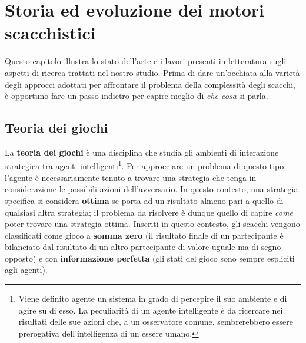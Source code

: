 \chapter{Storia ed evoluzione dei motori scacchistici} %
%
\begin{citazione}
    Questo capitolo illustra lo stato dell'arte e i lavori presenti in letteratura sugli aspetti di ricerca trattati nel nostro studio. 
    Prima di dare un'occhiata alla varietà degli approcci adottati per affrontare il problema della complessità degli scacchi, 
    è opportuno fare un passo indietro per capire meglio di \textit{che cosa} si parla.
\end{citazione}

\section{Teoria dei giochi}
La \textbf{teoria dei giochi} è una disciplina che studia gli ambienti di interazione strategica tra
agenti intelligenti\footnote{Viene definito agente un sistema in grado di percepire il suo ambiente e di agire su di esso. La peculiarità
di un agente intelligente è da ricercare nei risultati delle sue azioni che, a un osservatore comune, sembrerebbero essere prerogativa
dell'intelligenza di un essere umano.}. Per approcciare un problema di questo tipo, l'agente è necessariamente tenuto a trovare
una strategia che tenga in considerazione le possibili azioni dell'avversario. In questo contesto, una strategia specifica si considera
\textbf{ottima} se porta ad un risultato almeno pari a quello di qualsiasi altra strategia; il problema da risolvere è dunque 
quello di capire \textit{come} poter trovare una strategia ottima. Inseriti in questo contesto,
gli scacchi vengono classificati come gioco a \textbf{somma zero} (il risultato finale di un partecipante
è bilanciato dal risultato di un altro partecipante di valore uguale ma di segno opposto) e con \textbf{informazione perfetta} (gli stati
del gioco sono sempre espliciti agli agenti).

